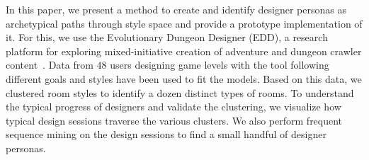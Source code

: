 In this paper, we present a method to create and identify designer personas as archetypical paths through style space and provide a prototype implementation of it. For this, we use the Evolutionary Dungeon Designer (EDD), a research platform for exploring mixed-initiative creation of adventure and dungeon crawler content~. Data from $48$ users designing game levels with the tool following different goals and styles have been used to fit the models. Based on this data, we clustered room styles to identify a dozen distinct types of rooms. To understand the typical progress of designers and validate the clustering, we visualize how typical design sessions traverse the various clusters. We also perform frequent sequence mining on the design sessions to find a small handful of designer personas.







